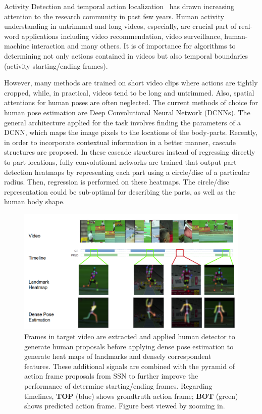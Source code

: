 Activity Detection and temporal action localization~\cite{zhao2017temporal,xu2017r,shou2017cdc,simonyan2014two,jiang2014thumos,caba2015activitynet,shou2016temporal} has drawn increasing attention to the research community in past few years. Human activity understanding in untrimmed and long videos, especially, are crucial part of real-word applications including video recommendation, video surveillance, human-machine interaction and many others. It is of importance for algorithms to determining not only actions contained in videos but also temporal boundaries (activity starting/ending frames).

However, many methods are trained on short video clips where actions are tightly cropped, while, in practical, videos tend to be long and untrimmed. Also, spatial attentions for human poses are often neglected. The current methods of choice for human pose estimation are Deep Convolutional Neural Network (DCNNs). The general architecture applied for the task involves finding the parameters of a DCNN, which maps the image pixels to the locations of the body-parts. Recently, in order to incorporate contextual information in a better manner, cascade structures are proposed. In these cascade structures instead of regressing directly to part locations, fully convolutional networks are trained that output part detection heatmaps by representing each part using a circle/disc of a particular radius. Then, regression is performed on these heatmaps. The circle/disc representation could be sub-optimal for describing the parts, as well as the human body shape.

\begin{figure}[t!]
\begin{center}
   \includegraphics[width=1\linewidth ]{resources/Human_Poses/timeline}
\end{center}
   \caption{ Frames in target video are extracted and applied human detector to generate human proposals before applying dense pose estimation to generate heat maps of landmarks and densely correspondent features. These additional signals are combined with the pyramid of action frame proposals from SSN to further improve the performance of determine starting/ending frames. Regarding timelines, \textbf{TOP} (blue) shows grondtruth action frame; \textbf{BOT} (green) shows predicted action frame. Figure best viewed by zooming in.}
\label{fig:FrontPage}
\end{figure}

